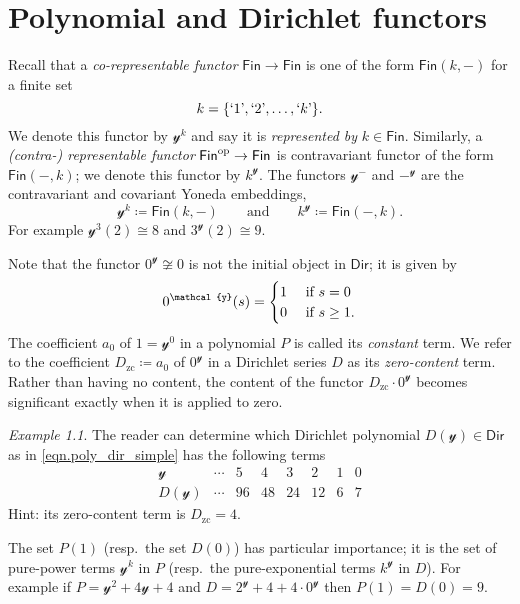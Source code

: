 \documentclass[11pt, article, one side]{memoir}
\theoremstyle{theorem}
\theoremstyle{definition}
\theoremstyle{remark}
\newtheorem{example}[section]{Example}
\newcommand{\Cat}[1]{\mathsf{#1}}%
\newcommand{\op}{^\tn{op}}
\newcommand{\tn}[1]{\textnormal{#1}}
\newcommand{\fin}{\Cat{Fin}}
\newcommand{\zero}[1]{#1_\text{zc}}
\newcommand{\yon}{\mathcal{y}}
\newcommand{\dir}{\Cat{Dir}}
\newcommand{\mdot}{{\cdot}}
\newcommand{\qqand}{\qquad\text{and}\qquad}
\begin{document}
\chapter{Polynomial and Dirichlet functors}

Recall that a \emph{co-representable functor} $\fin\to\fin$ is one of the form $\fin(k, -)$ for a finite set
\[k=\{`1\text{'}, `2\text{'},\ldots,`k\text{'}\}.\]
We denote this functor by $\yon^k$ and say it is \emph{represented by} $k\in\fin$. Similarly, a \emph{(contra-) representable functor} $\fin\op\to\fin$ is contravariant functor of the form $\fin(-,k)$; we denote this functor by $k^\yon$. The functors $\yon^-$ and $-^\yon$ are the contravariant and covariant Yoneda embeddings,
\[
  \yon^k \coloneqq \fin(k,-)
  \qqand
  k^\yon\coloneqq\fin(-,k).
\]
For example $\yon^3(2)\cong8$ and $3^\yon(2)\cong9$.

Note that the functor $0^\yon\not\cong 0$ is not the initial object in $\dir$; it is given by
\[
0^\yon(s)=
\begin{cases}
1&\tn{ if } s=0\\
0&\tn{ if } s\geq1.
\end{cases}
\]
The coefficient $a_0$ of $1=\yon^0$ in a polynomial $P$ is called its \emph{constant} term. We refer to the coefficient $\zero{D}\coloneqq a_0$ of $0^\yon$ in a Dirichlet series $D$ as its \emph{zero-content} term. Rather than having no content, the content of the functor $\zero{D}\mdot0^\yon$ becomes significant exactly when it is applied to zero.

\begin{example}
The reader can determine which Dirichlet polynomial $D(\yon)\in\dir$ as in \cref{eqn.poly_dir_simple} has the following terms
\[
\begin{array}{c|ccccccc}
\yon&
\cdots&
5&
4&
3&
2&
1&
0
\\\hline
D(\yon)&
\cdots&
96&
48&
24&
12&
6&
7
\end{array}
\]
Hint: its zero-content term is $\zero{D}=4$.
\end{example}

The set $P(1)$ (resp.\ the set $D(0)$) has particular importance; it is the set of pure-power terms $\yon^k$ in $P$ (resp.\ the pure-exponential terms $k^\yon$ in $D$). For example if $P=\yon^2+4\yon+4$ and $D=2^\yon+4+4\mdot0^\yon$ then $P(1)=D(0)=9$. 
\end{document}
